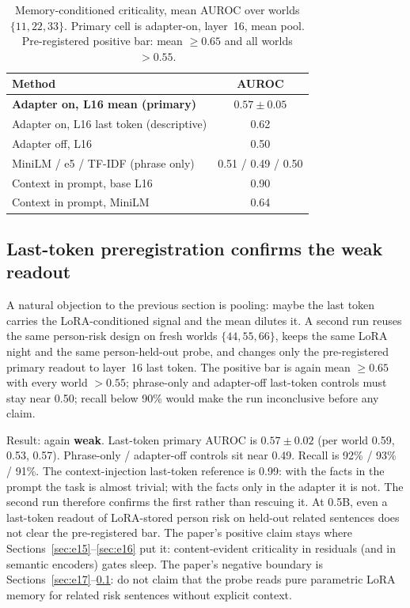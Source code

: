 \documentclass[11pt,a4paper]{article}
\begin{document}
\begin{table}[t]
\centering
\caption{Memory-conditioned criticality, mean AUROC over worlds $\{11,22,33\}$. Primary cell is adapter-on, layer~16, mean pool. Pre-registered positive bar: mean $\geq 0.65$ and all worlds $>0.55$.}
\label{tab:e17}
\small
\begin{tabular}{lc}
\toprule
Method & AUROC \\
\midrule
\textbf{Adapter on, L16 mean (primary)} & $\mathbf{0.57{\pm}0.05}$ \\
Adapter on, L16 last token (descriptive) & 0.62 \\
Adapter off, L16 & 0.50 \\
MiniLM / e5 / TF-IDF (phrase only) & 0.51 / 0.49 / 0.50 \\
Context in prompt, base L16 & 0.90 \\
Context in prompt, MiniLM & 0.64 \\
\bottomrule
\end{tabular}
\end{table}

\subsection{Last-token preregistration confirms the weak readout}
\label{sec:e17b}

A natural objection to the previous section is pooling: maybe the last token carries the LoRA-conditioned signal and the mean dilutes it.
A second run reuses the same person-risk design on fresh worlds $\{44,55,66\}$, keeps the same LoRA night and the same person-held-out probe, and changes only the pre-registered primary readout to layer~16 last token.
The positive bar is again mean $\geq 0.65$ with every world $>0.55$; phrase-only and adapter-off last-token controls must stay near 0.50; recall below 90\% would make the run inconclusive before any claim.

Result: again \textbf{weak}.
Last-token primary AUROC is $0.57{\pm}0.02$ (per world 0.59, 0.53, 0.57).
Phrase-only / adapter-off controls sit near 0.49.
Recall is 92\% / 93\% / 91\%.
The context-injection last-token reference is 0.99: with the facts in the prompt the task is almost trivial; with the facts only in the adapter it is not.
The second run therefore confirms the first rather than rescuing it.
At 0.5B, even a last-token readout of LoRA-stored person risk on held-out related sentences does not clear the pre-registered bar.
The paper's positive claim stays where Sections~\ref{sec:e15}--\ref{sec:e16} put it: content-evident criticality in residuals (and in semantic encoders) gates sleep.
The paper's negative boundary is Sections~\ref{sec:e17}--\ref{sec:e17b}: do not claim that the probe reads pure parametric LoRA memory for related risk sentences without explicit context.
\end{document}

